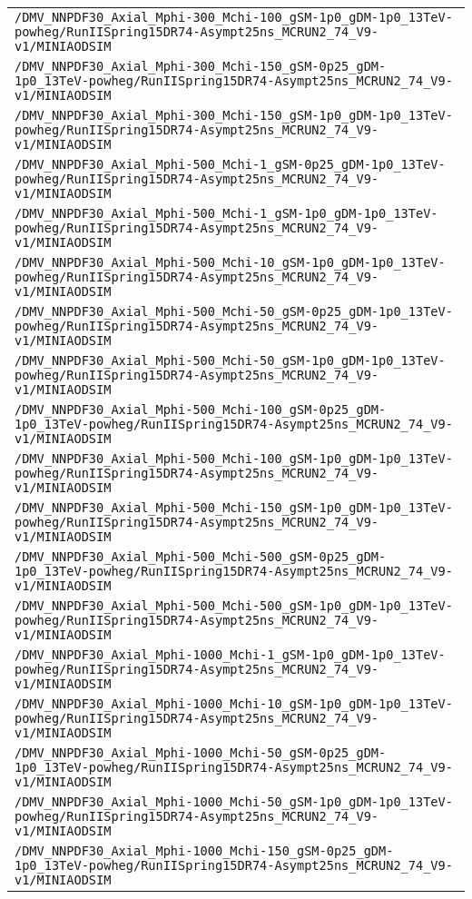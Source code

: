 \begin{center}
\begin{tabular}{l}
\verb!/DMV_NNPDF30_Axial_Mphi-300_Mchi-100_gSM-1p0_gDM-1p0_13TeV-powheg/RunIISpring15DR74-Asympt25ns_MCRUN2_74_V9-v1/MINIAODSIM! \tabularnewline
\verb!/DMV_NNPDF30_Axial_Mphi-300_Mchi-150_gSM-0p25_gDM-1p0_13TeV-powheg/RunIISpring15DR74-Asympt25ns_MCRUN2_74_V9-v1/MINIAODSIM! \tabularnewline
\verb!/DMV_NNPDF30_Axial_Mphi-300_Mchi-150_gSM-1p0_gDM-1p0_13TeV-powheg/RunIISpring15DR74-Asympt25ns_MCRUN2_74_V9-v1/MINIAODSIM! \tabularnewline
\verb!/DMV_NNPDF30_Axial_Mphi-500_Mchi-1_gSM-0p25_gDM-1p0_13TeV-powheg/RunIISpring15DR74-Asympt25ns_MCRUN2_74_V9-v1/MINIAODSIM! \tabularnewline
\verb!/DMV_NNPDF30_Axial_Mphi-500_Mchi-1_gSM-1p0_gDM-1p0_13TeV-powheg/RunIISpring15DR74-Asympt25ns_MCRUN2_74_V9-v1/MINIAODSIM! \tabularnewline
\verb!/DMV_NNPDF30_Axial_Mphi-500_Mchi-10_gSM-1p0_gDM-1p0_13TeV-powheg/RunIISpring15DR74-Asympt25ns_MCRUN2_74_V9-v1/MINIAODSIM! \tabularnewline
\verb!/DMV_NNPDF30_Axial_Mphi-500_Mchi-50_gSM-0p25_gDM-1p0_13TeV-powheg/RunIISpring15DR74-Asympt25ns_MCRUN2_74_V9-v1/MINIAODSIM! \tabularnewline
\verb!/DMV_NNPDF30_Axial_Mphi-500_Mchi-50_gSM-1p0_gDM-1p0_13TeV-powheg/RunIISpring15DR74-Asympt25ns_MCRUN2_74_V9-v1/MINIAODSIM! \tabularnewline
\verb!/DMV_NNPDF30_Axial_Mphi-500_Mchi-100_gSM-0p25_gDM-1p0_13TeV-powheg/RunIISpring15DR74-Asympt25ns_MCRUN2_74_V9-v1/MINIAODSIM! \tabularnewline
\verb!/DMV_NNPDF30_Axial_Mphi-500_Mchi-100_gSM-1p0_gDM-1p0_13TeV-powheg/RunIISpring15DR74-Asympt25ns_MCRUN2_74_V9-v1/MINIAODSIM! \tabularnewline
\verb!/DMV_NNPDF30_Axial_Mphi-500_Mchi-150_gSM-1p0_gDM-1p0_13TeV-powheg/RunIISpring15DR74-Asympt25ns_MCRUN2_74_V9-v1/MINIAODSIM! \tabularnewline
\verb!/DMV_NNPDF30_Axial_Mphi-500_Mchi-500_gSM-0p25_gDM-1p0_13TeV-powheg/RunIISpring15DR74-Asympt25ns_MCRUN2_74_V9-v1/MINIAODSIM! \tabularnewline
\verb!/DMV_NNPDF30_Axial_Mphi-500_Mchi-500_gSM-1p0_gDM-1p0_13TeV-powheg/RunIISpring15DR74-Asympt25ns_MCRUN2_74_V9-v1/MINIAODSIM! \tabularnewline
\verb!/DMV_NNPDF30_Axial_Mphi-1000_Mchi-1_gSM-1p0_gDM-1p0_13TeV-powheg/RunIISpring15DR74-Asympt25ns_MCRUN2_74_V9-v1/MINIAODSIM! \tabularnewline
\verb!/DMV_NNPDF30_Axial_Mphi-1000_Mchi-10_gSM-1p0_gDM-1p0_13TeV-powheg/RunIISpring15DR74-Asympt25ns_MCRUN2_74_V9-v1/MINIAODSIM! \tabularnewline
\verb!/DMV_NNPDF30_Axial_Mphi-1000_Mchi-50_gSM-0p25_gDM-1p0_13TeV-powheg/RunIISpring15DR74-Asympt25ns_MCRUN2_74_V9-v1/MINIAODSIM! \tabularnewline
\verb!/DMV_NNPDF30_Axial_Mphi-1000_Mchi-50_gSM-1p0_gDM-1p0_13TeV-powheg/RunIISpring15DR74-Asympt25ns_MCRUN2_74_V9-v1/MINIAODSIM! \tabularnewline
\verb!/DMV_NNPDF30_Axial_Mphi-1000_Mchi-150_gSM-0p25_gDM-1p0_13TeV-powheg/RunIISpring15DR74-Asympt25ns_MCRUN2_74_V9-v1/MINIAODSIM! \tabularnewline

\end{tabular}
\end{center}
